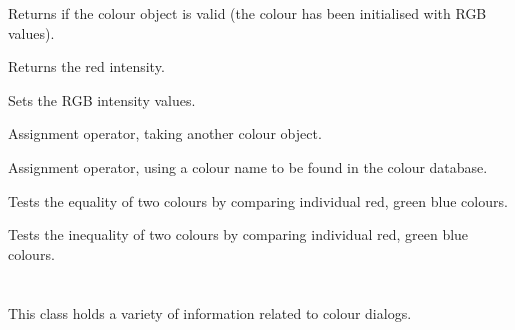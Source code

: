 
Returns \true if the colour object is valid (the colour has been initialised with RGB values).


\label{wxcolourred}


Returns the red intensity.


\label{wxcolourset}


Sets the RGB intensity values.


\label{wxcolourassign}


Assignment operator, taking another colour object.


Assignment operator, using a colour name to be found in the colour database.




\label{wxcolourequality}


Tests the equality of two colours by comparing individual red, green blue colours.


\label{wxcolourinequality}


Tests the inequality of two colours by comparing individual red, green blue colours.

\section{}\label{wxcolourdata}

This class holds a variety of information related to colour dialogs.



